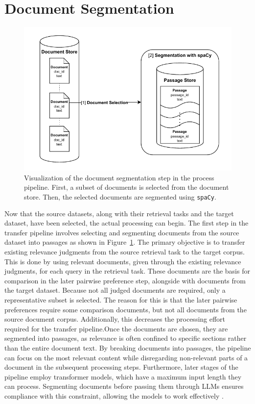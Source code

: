 \section{Document Segmentation}\label{document-segmentation}

\begin{figure}[t]
    \centering
    \includegraphics[width=\textwidth]{./graphics/drawio/document_segmentation.pdf}
    \caption{Visualization of the document segmentation step in the process pipeline. First, a subset of documents is selected from the document store. Then, the selected documents are segmented using \texttt{spaCy}.}
    \label{fig:document-segmentation}
\end{figure}

Now that the source datasets, along with their retrieval tasks and the target dataset, have been selected, the actual processing can begin. The first step in the transfer pipeline involves selecting and segmenting documents from the source dataset into passages as shown in Figure~\ref{fig:document-segmentation}. The primary objective is to transfer existing relevance judgments from the source retrieval task to the target corpus. This is done by using relevant documents, given through the existing relevance judgments, for each query in the retrieval task. These documents are the basis for comparison in the later pairwise preference step, alongside with documents from the target dataset. Because not all judged documents are required, only a representative subset is selected. The reason for this is that the later pairwise preferences require some comparison documents, but not all documents from the source document corpus. Additionally, this decreases the processing effort required for the transfer pipeline.Once the documents are chosen, they are segmented into passages, as relevance is often confined to specific sections rather than the entire document text. By breaking documents into passages, the pipeline can focus on the most relevant content while disregarding non-relevant parts of a document in the subsequent processing steps. Furthermore, later stages of the pipeline employ transformer models, which have a maximum input length they can process. Segmenting documents before passing them through LLMs ensures compliance with this constraint, allowing the models to work effectively \citep{levy:2024}.


